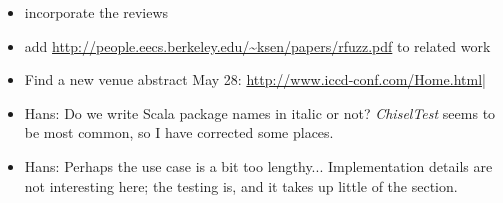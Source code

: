 \documentclass[conference]{IEEEtran}
\newcommand{\hjd}[1]{{\color{pink} Hans: #1}}
\begin{document}
\begin{itemize}
\item incorporate the reviews
\item add \url{http://people.eecs.berkeley.edu/~ksen/papers/rfuzz.pdf} to related work
\item Find a new venue abstract May 28: \url{http://www.iccd-conf.com/Home.html|}
\item \hjd{Do we write Scala package names in italic or not? \textit{ChiselTest} seems to be most common, so I have corrected some places.}
\item \hjd{Perhaps the use case is a bit too lengthy... Implementation details are not interesting here; the testing is, and it takes up little of the section.}
\end{itemize}


%
%
%
%
%
%
%
%
%
%
%
\end{document}
